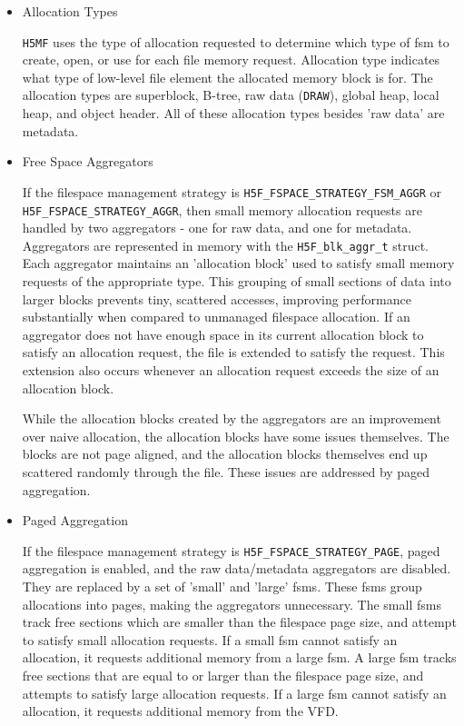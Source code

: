 \begin{itemize}

    \item Allocation Types

\texttt{H5MF} uses the type of allocation requested to determine which type of \Gls{fsm} to create, open, or use for each file memory request. Allocation type indicates what type of low-level file element the allocated memory block is for. The allocation types are superblock, B-tree, raw data (\texttt{DRAW}), global heap, local heap, and object header. All of these allocation types besides 'raw data' are metadata.

    \item Free Space Aggregators

If the filespace management strategy is \texttt{H5F\_FSPACE\_STRATEGY\_FSM\_AGGR} or \\ \texttt{H5F\_FSPACE\_STRATEGY\_AGGR}, then small memory allocation requests are handled by two aggregators - one for raw data, and one for metadata. Aggregators are represented in memory with the \texttt{H5F\_blk\_aggr\_t} struct. Each aggregator maintains an 'allocation block' used to satisfy small memory requests of the appropriate type. This grouping of small sections of data into larger blocks prevents tiny, scattered accesses, improving performance substantially when compared to unmanaged filespace allocation. If an aggregator does not have enough space in its current allocation block to satisfy an allocation request, the file is extended to satisfy the request. This extension also occurs whenever an allocation request exceeds the size of an allocation block.

While the allocation blocks created by the aggregators are an improvement over naive allocation, the allocation blocks have some issues themselves. The blocks are not page aligned, and the allocation blocks themselves end up scattered randomly through the file. These issues are addressed by paged aggregation.  

    \item Paged Aggregation

If the filespace management strategy is \texttt{H5F\_FSPACE\_STRATEGY\_PAGE}, paged aggregation is enabled, and the raw data/metadata aggregators are disabled. They are replaced by a set of 'small' and 'large' \Glspl{fsm}. These \Glspl{fsm} group allocations into pages, making the aggregators unnecessary. The small \Glspl{fsm} track free sections which are smaller than the filespace page size, and attempt to satisfy small allocation requests. If a small \Gls{fsm} cannot satisfy an allocation, it requests additional memory from a large \Gls{fsm}. A large \Gls{fsm} tracks free sections that are equal to or larger than the filespace page size, and attempts to satisfy large allocation requests. If a large \Gls{fsm} cannot satisfy an allocation, it requests additional memory from the VFD.


\end{itemize}
